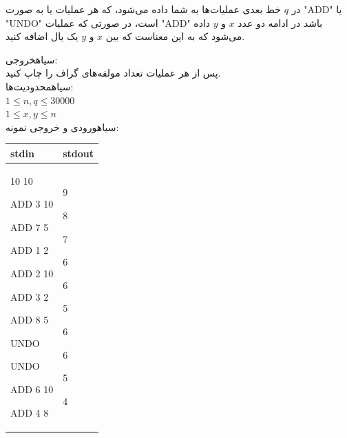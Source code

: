 در 
$q$
خط بعدی عملیات‌ها به شما داده می‌شود،
که هر عملیات یا به صورت
"ADD"
یا
"UNDO"
است،
در صورتی که عملیات 
"ADD"
باشد در ادامه دو عدد
$x$
و
$y$
داده می‌شود که به این معناست که بین 
$x$
و 
$y$
یک یال اضافه کنید.

\noindent
{}‌سیاه{خروجی:}\\
پس از هر عملیات تعداد مولفه‌های گراف را چاپ کنید.\\
‌سیاه{محدودیت‌ها:}\\
$1\leq n,q\leq 30000$\\
$1\leq x , y\leq n$\\

‌سیاه{ورودی و خروجی نمونه:}\\


\begin{latin}
	\begin{tabularx}{\textwidth}{|X | X|}
		\hline
		\textbf{stdin} &
		\textbf{stdout}\\
		\hline
	    10 10
	    
        ADD 3 10
        
        ADD 7 5
        
        ADD 1 2
        
        ADD 2 10
        
        ADD 3 2
        
        ADD 8 5
        
        UNDO
        
        UNDO
        
        ADD 6 10
        
        ADD 4 8
	    &
	    9
	    
        8
        
        7
        
        6
        
        6
        
        5
        
        6
        
        6
        
        5
        
        4
        \\
		\hline
		
	\end{tabularx}
\end{latin}

